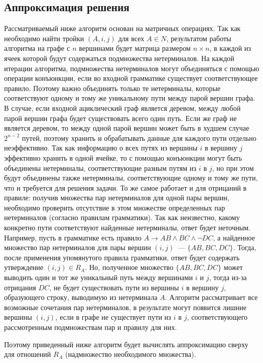 \subsection{Аппроксимация решения}
Рассматриваемый ниже алгоритм основан на матричных операциях. Так как необходимо найти тройки $(A, i, j)$ для всех $A \in N$, результатом работы алгоритма на графе с $n$ вершинами будет матрица размером $n \times n$, в каждой из ячеек которой будут содержаться подмножества нетерминалов. На каждой итерации алгоритма, подмножества нетерминалов могут объединяться с помощью операции конъюнкции, если во входной грамматике существует соответствующее правило. Поэтому важно объединять только те нетерминалы, которые соответствуют одному и тому же уникальному пути между парой вершин графа. В случае, если входной ациклический граф является деревом, между любой парой вершин графа будет существовать всего один путь. Если же граф не является деревом, то между одной парой вершин может быть в худшем случае $2^{n-2}$ путей, поэтому хранить и обрабатывать данные для каждого пути отдельно неэффективно. Так как информацию о всех путях из вершины $i$ в вершину $j$ эффективно хранить в одной ячейке, то с помощью конъюнкции могут быть объединены нетерминалы, соответствующие разным путям из $i$ в $j$, но при этом будут объединены также нетерминалы, соответствующие одному и тому же пути, что и требуется для решения задачи. То же самое работает и для отрицаний в правиле: получив множества пар нетерминалов для одной пары вершин, необходимо проверить отсутствие в этом множестве определенных пар нетерминалов (согласно правилам грамматики). Так как неизвестно, какому конкретно пути соответствуют найденные нетерминалы, ответ будет неточным. Например, пусть в грамматике есть правило $A \to AB \wedge BC \wedge \neg DC$, а найденное множество пар нетерминалов для пары вершин $(i, j)$~--- $\{ AB, BC, DC\}$. Тогда, после применения упомянутого правила грамматики, ответ будет содержать утверждение $(i, j) \in R_A$. Но, полученное множество $\{ AB, BC, DC\}$ может выводить один и тот же уникальный путь между вершинами $i$ и $j$, тогда из-за отрицания $DC$, не будет существовать пути из вершины $i$ в вершину $j$, образующего строку, выводимую из нетерминала $A$. Алгоритм рассматривает все возможные сочетания пар нетерминалов, в результате могут появится лишние вершины $(i,j)$, если в графе не существует пути из $i$ в $j$, соответствующего рассмотренным подмножествам пар и правилу для них.

Поэтому приведенный ниже алгоритм будет вычислять аппроксимацию сверху для отношений $R_A$ (надмножество необходимого множества).
